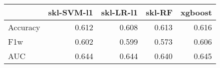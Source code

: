 \begin{tabular}{lrrrr}
\toprule
{} &  skl-SVM-l1 &  skl-LR-l1 &  skl-RF &  xgboost \\
\midrule
Accuracy &       0.612 &      0.608 &   0.613 &    0.616 \\
F1w      &       0.602 &      0.599 &   0.573 &    0.606 \\
AUC      &       0.644 &      0.644 &   0.640 &    0.645 \\
\bottomrule
\end{tabular}
